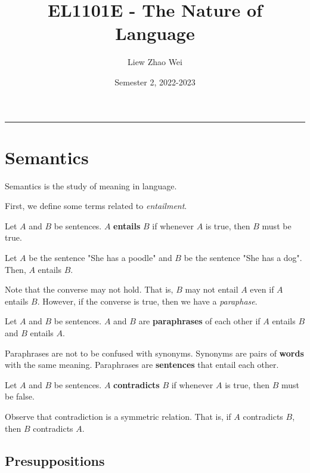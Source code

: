 \documentclass{article}
\title{EL1101E - The Nature of Language}
\author{Liew Zhao Wei}
\date{Semester 2, 2022-2023}
\begin{document}
\maketitle
\hrule

\section{Semantics}

Semantics is the study of meaning in language.

First, we define some terms related to \emph{entailment}.

\begin{definition}[Entailment]
  Let $A$ and $B$ be sentences. $A$ \textbf{entails} $B$ if whenever $A$ is true, then $B$ must be true.
\end{definition}

\begin{example}
  Let $A$ be the sentence "She has a poodle" and $B$ be the sentence "She has a dog". Then, $A$ entails $B$.
\end{example}

Note that the converse may not hold. That is, $B$ may not entail $A$ even if $A$ entails $B$. However, if the converse is true, then we have a \emph{paraphase}.

\begin{definition}[Paraphrase]
  Let $A$ and $B$ be sentences. $A$ and $B$ are \textbf{paraphrases} of each other if $A$ entails $B$ and $B$ entails $A$.
\end{definition}

\begin{remark}
  Paraphrases are not to be confused with synonyms. Synonyms are pairs of \textbf{words} with the same meaning. Paraphrases are \textbf{sentences} that entail each other.
\end{remark}

\begin{definition}[Contradiction]
  Let $A$ and $B$ be sentences. $A$ \textbf{contradicts} $B$ if whenever $A$ is true, then $B$ must be false.
\end{definition}

Observe that contradiction is a symmetric relation. That is, if $A$ contradicts $B$, then $B$ contradicts $A$.

\subsection{Presuppositions}
\end{document}
